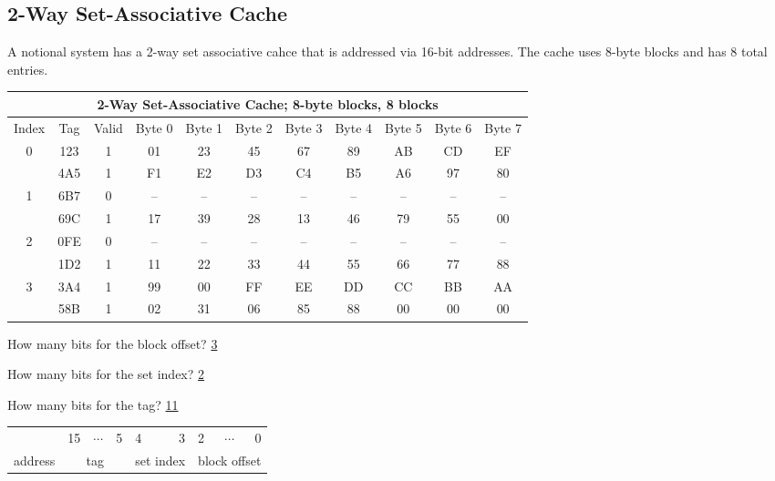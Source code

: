 \documentclass{article}
\begin{document}
\subsection{2-Way Set-Associative Cache}

A notional system has a 2-way set associative cahce that is addressed via 16-bit addresses. The cache uses 8-byte blocks and has 8 total entries.

\begin{tabular}{||c|c|c||c|c|c|c|c|c|c|c||} \hline\hline
\multicolumn{11}{||c||}{2-Way Set-Associative Cache; 8-byte blocks, 8 blocks} \\ \hline
Index & Tag & Valid & Byte 0 & Byte 1 & Byte 2 & Byte 3 & Byte 4 & Byte 5 & Byte 6 & Byte 7 \\ \hline\hline
\multirow{2}{*}{0} & 123 & 1 & 01 & 23 & 45 & 67 & 89 & AB & CD & EF \\ \cline{2-11}
                   & 4A5 & 1 & F1 & E2 & D3 & C4 & B5 & A6 & 97 & 80 \\ \hline
\multirow{2}{*}{1} & 6B7 & 0 & -- & -- & -- & -- & -- & -- & -- & -- \\ \cline{2-11}
                   & 69C & 1 & 17 & 39 & 28 & 13 & 46 & 79 & 55 & 00 \\ \hline
\multirow{2}{*}{2} & 0FE & 0 & -- & -- & -- & -- & -- & -- & -- & -- \\ \cline{2-11}
                   & 1D2 & 1 & 11 & 22 & 33 & 44 & 55 & 66 & 77 & 88 \\ \hline
\multirow{2}{*}{3} & 3A4 & 1 & 99 & 00 & FF & EE & DD & CC & BB & AA \\ \cline{2-11}
                   & 58B & 1 & 02 & 31 & 06 & 85 & 88 & 00 & 00 & 00 \\ \hline\hline
\end{tabular}

How many bits for the block offset? \underline{3}

How many bits for the set index? \underline{2}

How many bits for the tag? \underline{11}

\phantom{x}

\begin{tabular}{llcrlrlcr}
& 15 & $\cdots$ & 5 & 4 & 3 & 2 & $\cdots$ & 0 \\ \cline{2-9}
address & \multicolumn{3}{|c|}{tag} & \multicolumn{2}{|c|}{set index} & \multicolumn{3}{|c|}{block offset} \\ \cline{2-9}
\end{tabular}
\end{document}

